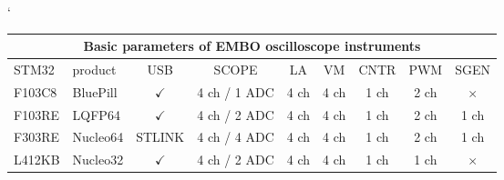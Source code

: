 \documentclass{article}
\begin{document}
\begin{table}[!htbp]
\catcode`
\bgroup
\def\arraystretch{1.5}%
\begin{tabular}  { |l|l||c|c|c|c|c|c|c| }
 \hline
 \multicolumn{9}{|c|}{ Basic parameters of EMBO oscilloscope instruments } \\
 \hline
 STM32 & product & USB & SCOPE & LA & VM & CNTR & PWM & SGEN \\
 \hhline{|=|=||=|=|=|=|=|=|=|}
F103C8 & BluePill & $\checkmark$ & 4 ch / 1 ADC  & 4 ch  & 4 ch & 1 ch & 2 ch & $\times$  \\
F103RE & LQFP64 & $\checkmark$ & 4 ch / 2 ADC  & 4 ch  & 4 ch & 1 ch & 2 ch & 1 ch  \\
F303RE & Nucleo64 & STLINK & 4 ch / 4 ADC  & 4 ch  & 4 ch & 1 ch & 2 ch & 1 ch  \\
L412KB & Nucleo32 & $\checkmark$ & 4 ch / 2 ADC  & 4 ch  & 4 ch & 1 ch & 1 ch & $\times$ \\
 \hline
\end{tabular}
\egroup
\end{table}
\end{document}
